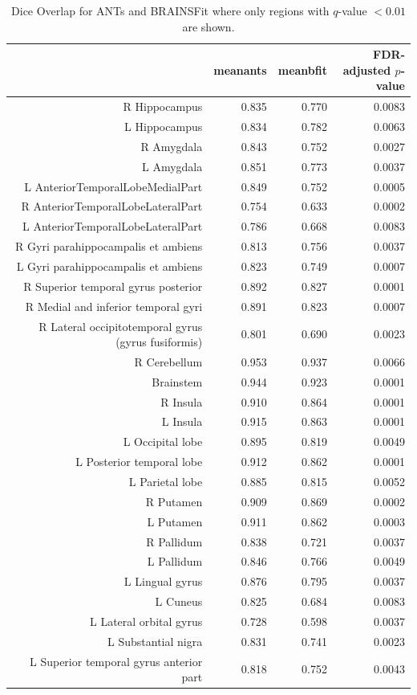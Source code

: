 \documentclass{frontiersSCNS}
\begin{document}
\begin{table}[ht]
\begin{tiny}
\centering
\begin{tabular}{rrrr}
  \hline
 & meanants & meanbfit & FDR-adjusted $p$-value \\ 
  \hline
R Hippocampus & 0.835 & 0.770 & 0.0083 \\ 
  L Hippocampus & 0.834 & 0.782 & 0.0063 \\ 
  R Amygdala & 0.843 & 0.752 & 0.0027 \\ 
  L Amygdala & 0.851 & 0.773 & 0.0037 \\ 
  L AnteriorTemporalLobeMedialPart & 0.849 & 0.752 & 0.0005 \\ 
  R AnteriorTemporalLobeLateralPart & 0.754 & 0.633 & 0.0002 \\ 
  L AnteriorTemporalLobeLateralPart & 0.786 & 0.668 & 0.0083 \\ 
  R Gyri parahippocampalis et ambiens & 0.813 & 0.756 & 0.0037 \\ 
  L Gyri parahippocampalis et ambiens & 0.823 & 0.749 & 0.0007 \\ 
  R Superior temporal gyrus posterior & 0.892 & 0.827 & 0.0001 \\ 
  R Medial and inferior temporal gyri & 0.891 & 0.823 & 0.0007 \\ 
  R Lateral occipitotemporal gyrus (gyrus fusiformis) & 0.801 & 0.690 & 0.0023 \\ 
  R Cerebellum & 0.953 & 0.937 & 0.0066 \\ 
  Brainstem & 0.944 & 0.923 & 0.0001 \\ 
  R Insula & 0.910 & 0.864 & 0.0001 \\ 
  L Insula & 0.915 & 0.863 & 0.0001 \\ 
  L Occipital lobe & 0.895 & 0.819 & 0.0049 \\ 
  L Posterior temporal lobe & 0.912 & 0.862 & 0.0001 \\ 
  L Parietal lobe & 0.885 & 0.815 & 0.0052 \\ 
  R Putamen & 0.909 & 0.869 & 0.0002 \\ 
  L Putamen & 0.911 & 0.862 & 0.0003 \\ 
  R Pallidum & 0.838 & 0.721 & 0.0037 \\ 
  L Pallidum & 0.846 & 0.766 & 0.0049 \\ 
  L Lingual gyrus & 0.876 & 0.795 & 0.0037 \\ 
  L Cuneus & 0.825 & 0.684 & 0.0083 \\ 
  L Lateral orbital gyrus & 0.728 & 0.598 & 0.0037 \\ 
  L Substantial nigra & 0.831 & 0.741 & 0.0023 \\ 
  L Superior temporal gyrus anterior part & 0.818 & 0.752 & 0.0043 \\ 
   \hline
\end{tabular}
\caption{Dice Overlap for ANTs and BRAINSFit where only regions with
  $q$-value $<0.01$ are shown.} 
\end{tiny}
\end{table}
\end{document}
